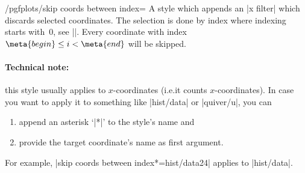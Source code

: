 \begin{stylekey}{/pgfplots/skip coords between index=}
    A style which appends an |x filter| which discards selected coordinates.
    The selection is done by index where indexing starts with~$0$, see
    |\coordindex|. Every coordinate with index $\meta{begin} \le i <
    \meta{end}$ will be skipped.
\begin{codeexample}[]
\end{codeexample}

    \paragraph{Technical note:}

    this style usually applies to $x$-coordinates (i.e.\@ it counts
    $x$-coordinates). In case you want to apply it to something like |hist/data|
    or |quiver/u|, you can
    \begin{enumerate}
        \item append an asterisk `|*|' to the style's name and
        \item provide the target coordinate's name as first argument.
    \end{enumerate}
    For example, |skip coords between index*={hist/data}{2}{4}| applies to
    |hist/data|.
\end{stylekey}

